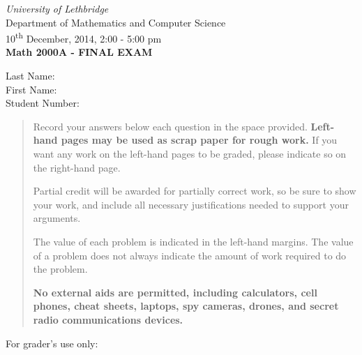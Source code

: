 \documentclass[12pt]{article}
\newcommand{\skipline}{\vspace{12pt}}
\begin{document}
\author{Instructor: Sean Fitzpatrick}
\thispagestyle{plain}
\begin{center}
\emph{University of Lethbridge}\\
Department of Mathematics and Computer Science\\
10\textsuperscript{th} December, 2014, 2:00 - 5:00 pm\\
{\bf Math 2000A - FINAL EXAM}\\
\end{center}
\skipline \skipline \skipline \noindent \skipline
Last Name:\underline{\hspace{350pt}}\\
\skipline
First Name:\underline{\hspace{348pt}}\\
\skipline
Student Number:\underline{\hspace{322pt}}\\


\vspace{0.5in}


\begin{quote}
 Record your answers below each question in the space provided.    {\bf Left-hand pages may be used as scrap paper for rough work.}  If you want any work on the left-hand pages to be graded, please indicate so on the right-hand page.
 
 \bigskip
 
Partial credit will be awarded for partially correct work, so be sure to show your work, and include all necessary justifications needed to support your arguments. 

The value of each problem is indicated in the left-hand margins. The value of a problem does not always indicate the amount of work required to do the problem.

{\bf No external aids are permitted, including calculators, cell phones, cheat sheets, laptops, spy cameras, drones, and secret radio communications devices.}
\end{quote}


\vspace{0.5in}

For grader's use only:
\end{document}
